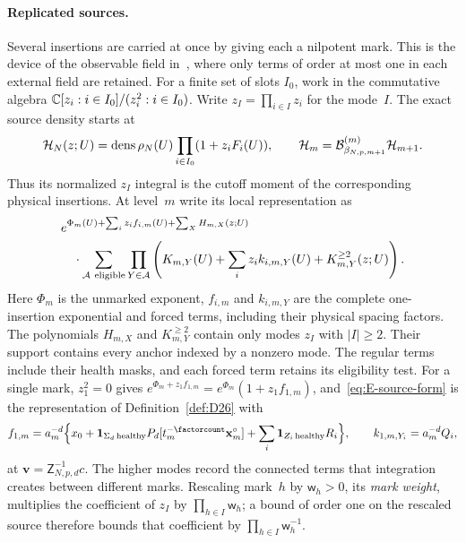 \paragraph{Replicated sources.}
Several insertions are carried at once by giving each a nilpotent mark. This is the device of the observable field in~\cite[Section~2.3]{BauerschmidtBrydgesSlade2015}, where only terms of order at most one in each external field are retained. For a finite set of slots $I_0$, work in the commutative algebra $\mathbb{C}[z_i:i\in I_0]/(z_i^2:i\in I_0)$. Write $z_I=\prod_{i\in I}z_i$ for the mode~$I$. The exact source density starts at
\begin{equation}\label{eq:E-multiple-density}
 \mathcal H_N(z;U)=\operatorname{dens}\rho_N(U)\prod_{i\in I_0}(1+z_iF_i(U)),
 \qquad \mathcal H_m=\mathcal{B}^{(m)}_{\beta_{N,p,m+1}}\mathcal H_{m+1}.
\end{equation}
Thus its normalized $z_I$ integral is the cutoff moment of the corresponding physical insertions. At level~$m$ write its local representation as
\begin{equation}\label{eq:E-source-form}
\begin{aligned}
 &e^{\Phi_m(U)+\sum_i z_if_{i,m}(U)+\sum_X H_{m,X}(z;U)}
 \\
 &\quad\cdot\sum_{\mathcal A\ {\rm eligible}}
 \prod_{Y\in\mathcal A}
 \left(K_{m,Y}(U)+\sum_i z_i k_{i,m,Y}(U)+K^{\ge2}_{m,Y}(z;U)\right).
\end{aligned}
\end{equation}
Here $\Phi_m$ is the unmarked exponent, $f_{i,m}$ and $k_{i,m,Y}$ are the complete one-insertion exponential and forced terms, including their physical spacing factors. The polynomials $H_{m,X}$ and $K^{\ge2}_{m,Y}$ contain only modes $z_I$ with $|I|\ge2$. Their support contains every anchor indexed by a nonzero mode. The regular terms include their health masks, and each forced term retains its eligibility test. For a single mark, $z_1^2=0$ gives $e^{\Phi_m+z_1f_{1,m}}=e^{\Phi_m}(1+z_1f_{1,m})$, and~\eqref{eq:E-source-form} is the representation of Definition~\ref{def:D26} with
\begin{equation*}
 f_{1,m}=a_m^{-d}\Bigl\{x_0+\mathbf1_{\Sigma_d\,\mathrm{healthy}}P_d[t_m^{-\factorcount}\mathbf x_m^\circ]+\sum_i\mathbf1_{Z_i\,\mathrm{healthy}}R_i\Bigr\},
 \qquad k_{1,m,Y_i}=a_m^{-d}Q_i,
\end{equation*}
at $\mathbf v=\mathsf Z^{-1}_{N,p,d}c$. The higher modes record the connected terms that integration creates between different marks. Rescaling mark~$h$ by $\mathsf w_h>0$, its \emph{mark weight}, multiplies the coefficient of $z_I$ by $\prod_{h\in I}\mathsf w_h$; a bound of order one on the rescaled source therefore bounds that coefficient by $\prod_{h\in I}\mathsf w_h^{-1}$.

